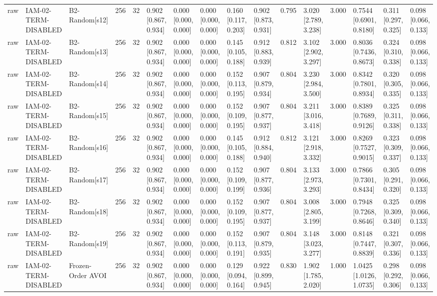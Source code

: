\begin{table}[!ht]
{\begin{tabular}{llllllllllllllll}
raw & IAM-02-TERM-DISABLED & B2-Random[s12] & 256 & 32 & 0.902 [0.867, 0.934] & 0.000 [0.000, 0.000] & 0.000 [0.000, 0.000] & 0.160 [0.117, 0.203] & 0.902 [0.873, 0.931] & 0.795 & 3.020 [2.789, 3.238] & 3.000 & 0.7544 [0.6901, 0.8180] & 0.311 [0.297, 0.325] & 0.098 [0.066, 0.133] \\
raw & IAM-02-TERM-DISABLED & B2-Random[s13] & 256 & 32 & 0.902 [0.867, 0.934] & 0.000 [0.000, 0.000] & 0.000 [0.000, 0.000] & 0.145 [0.105, 0.188] & 0.912 [0.883, 0.939] & 0.812 & 3.102 [2.902, 3.297] & 3.000 & 0.8036 [0.7436, 0.8673] & 0.324 [0.310, 0.338] & 0.098 [0.066, 0.133] \\
raw & IAM-02-TERM-DISABLED & B2-Random[s14] & 256 & 32 & 0.902 [0.867, 0.934] & 0.000 [0.000, 0.000] & 0.000 [0.000, 0.000] & 0.152 [0.113, 0.195] & 0.907 [0.879, 0.934] & 0.804 & 3.230 [2.984, 3.500] & 3.000 & 0.8342 [0.7801, 0.8934] & 0.320 [0.305, 0.335] & 0.098 [0.066, 0.133] \\
raw & IAM-02-TERM-DISABLED & B2-Random[s15] & 256 & 32 & 0.902 [0.867, 0.934] & 0.000 [0.000, 0.000] & 0.000 [0.000, 0.000] & 0.152 [0.109, 0.195] & 0.907 [0.877, 0.937] & 0.804 & 3.211 [3.016, 3.418] & 3.000 & 0.8389 [0.7689, 0.9126] & 0.325 [0.311, 0.338] & 0.098 [0.066, 0.133] \\
raw & IAM-02-TERM-DISABLED & B2-Random[s16] & 256 & 32 & 0.902 [0.867, 0.934] & 0.000 [0.000, 0.000] & 0.000 [0.000, 0.000] & 0.145 [0.105, 0.188] & 0.912 [0.884, 0.940] & 0.812 & 3.121 [2.918, 3.332] & 3.000 & 0.8269 [0.7527, 0.9015] & 0.323 [0.309, 0.337] & 0.098 [0.066, 0.133] \\
raw & IAM-02-TERM-DISABLED & B2-Random[s17] & 256 & 32 & 0.902 [0.867, 0.934] & 0.000 [0.000, 0.000] & 0.000 [0.000, 0.000] & 0.152 [0.109, 0.199] & 0.907 [0.877, 0.936] & 0.804 & 3.133 [2.973, 3.293] & 3.000 & 0.7866 [0.7301, 0.8434] & 0.305 [0.291, 0.320] & 0.098 [0.066, 0.133] \\
raw & IAM-02-TERM-DISABLED & B2-Random[s18] & 256 & 32 & 0.902 [0.867, 0.934] & 0.000 [0.000, 0.000] & 0.000 [0.000, 0.000] & 0.152 [0.109, 0.195] & 0.907 [0.877, 0.937] & 0.804 & 3.008 [2.805, 3.199] & 3.000 & 0.7948 [0.7268, 0.8646] & 0.325 [0.309, 0.340] & 0.098 [0.066, 0.133] \\
raw & IAM-02-TERM-DISABLED & B2-Random[s19] & 256 & 32 & 0.902 [0.867, 0.934] & 0.000 [0.000, 0.000] & 0.000 [0.000, 0.000] & 0.152 [0.113, 0.191] & 0.907 [0.879, 0.935] & 0.804 & 3.148 [3.023, 3.277] & 3.000 & 0.8148 [0.7447, 0.8839] & 0.321 [0.307, 0.336] & 0.098 [0.066, 0.133] \\
raw & IAM-02-TERM-DISABLED & Frozen-Order AVOI & 256 & 32 & 0.902 [0.867, 0.934] & 0.000 [0.000, 0.000] & 0.000 [0.000, 0.000] & 0.129 [0.094, 0.164] & 0.922 [0.899, 0.945] & 0.830 & 1.902 [1.785, 2.020] & 1.000 & 1.0425 [1.0126, 1.0735] & 0.298 [0.292, 0.306] & 0.098 [0.066, 0.133] \\

\end{tabular}}
\end{table}
